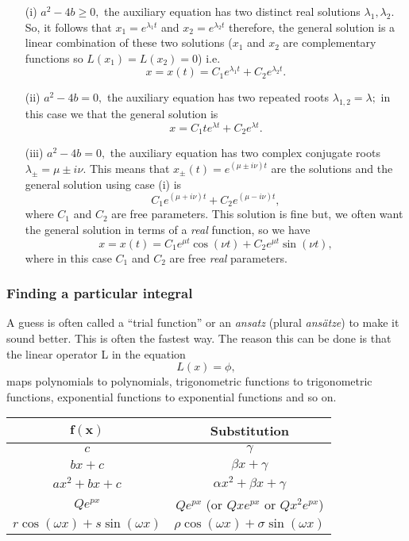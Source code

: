 \documentclass[12pt, a4paper]{article}
\begin{document}
\begin{enumerate}
	
	\item[(i)] $a^2-4b \geq 0,$ the auxiliary equation has two distinct real solutions $\lambda_1,\lambda_2.$ So, it follows that $x_1=e^{\lambda_1t}$ and $x_2=e^{\lambda_2t}$ therefore, the general solution is a linear combination of these two solutions ($x_1$ and $x_2$ are complementary functions so $L(x_1)=L(x_2)=0$) i.e. $$x=x(t)=C_1e^{\lambda_1t}+C_2e^{\lambda_2t}.$$

	\item[(ii)] $a^2-4b=0,$ the auxiliary equation has two repeated roots $\lambda_{1,2} =\lambda;$ in this case we that the general solution is $$x=C_1te^{\lambda t}+C_2e^{\lambda t}.$$

	\item[(iii)] $a^2-4b=0,$ the auxiliary equation has two complex conjugate roots $\lambda_{\pm}=\mu \pm i\nu.$ This means that $x_{\pm}(t)=e^{(\mu \pm i\nu)t}$ are the solutions and the general solution using case (i) is $$C_1e^{(\mu + i\nu)t}+C_2e^{(\mu - i\nu)t},$$ where $C_1$ and $C_2$ are free parameters. This solution is fine but, we often want the general solution in terms of a \textit{real} function, so we have $$x=x(t)=C_1e^{\mu t}\cos{(\nu t)}+C_2e^{\mu t}\sin{(\nu t)},$$ where in this case $C_1$ and $C_2$ are free \textit{real} parameters. 

\end{enumerate}

\subsubsection*{Finding a particular integral}

A guess is often called a “trial function” or an \textit{ansatz} (plural \textit{ansätze}) to make it sound better. This is often the fastest way. The reason this can be done is that the linear operator L in the equation $$L(x)=\phi,$$ maps polynomials to polynomials, trigonometric functions to trigonometric functions, exponential functions to exponential functions and so on.

\begin{center}
\begin{tabular}{|c|c|} 
 \hline
 $\mathbf{f(x)}$ & \textbf{Substitution} \\ \hline
 $c$ & $\gamma$ \\ \hline
 $bx+c$ & $\beta x+ \gamma$ \\ \hline
 $ax^2+bx+c$ & $\alpha x^2+\beta x +\gamma$ \\ \hline
 $Qe^{px}$ & $Qe^{px}$ (or $Qxe^{px}$ or $Qx^2e^{px}$) \\ \hline
 $r\cos{(\omega x)}+s\sin{(\omega x)}$ & $\rho \cos{(\omega x)}+\sigma \sin{(\omega x)}$ \\ \hline
\end{tabular}
\end{center}
\end{document}

